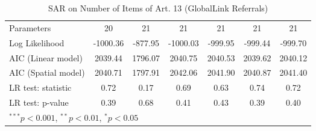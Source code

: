 \begin{table}[!h]
\begin{center}
\begin{tabular}{l c c c c c c }
Parameters              & 20           & 21           & 21           & 21           & 21           & 21           \\
Log Likelihood          & -1000.36     & -877.95      & -1000.03     & -999.95      & -999.44      & -999.70      \\
AIC (Linear model)      & 2039.44      & 1796.07      & 2040.75      & 2040.53      & 2039.62      & 2040.12      \\
AIC (Spatial model)     & 2040.71      & 1797.91      & 2042.06      & 2041.90      & 2040.87      & 2041.40      \\
LR test: statistic      & 0.72         & 0.17         & 0.69         & 0.63         & 0.74         & 0.72         \\
LR test: p-value        & 0.39         & 0.68         & 0.41         & 0.43         & 0.39         & 0.40         \\
\bottomrule
\multicolumn{7}{l}{\scriptsize{$^{***}p<0.001$, $^{**}p<0.01$, $^*p<0.05$}}
\end{tabular}
\caption{SAR on Number of Items of Art. 13 (GlobalLink Referrals)}
\label{table:coefficients}
\end{center}
\end{table}
